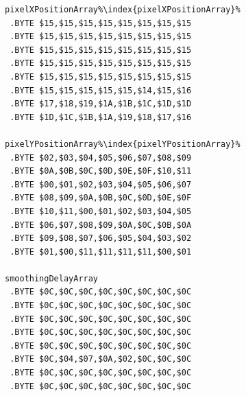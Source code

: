 \begin{minipage}[b]{0.33\linewidth}
\begin{lrbox}{\mybox}
\begin{lstlisting}[basicstyle=\ttfamily\tiny,escapechar=\%]
pixelXPositionArray%\index{pixelXPositionArray}%   
 .BYTE $15,$15,$15,$15,$15,$15,$15,$15
 .BYTE $15,$15,$15,$15,$15,$15,$15,$15
 .BYTE $15,$15,$15,$15,$15,$15,$15,$15
 .BYTE $15,$15,$15,$15,$15,$15,$15,$15
 .BYTE $15,$15,$15,$15,$15,$15,$15,$15
 .BYTE $15,$15,$15,$15,$15,$14,$15,$16
 .BYTE $17,$18,$19,$1A,$1B,$1C,$1D,$1D
 .BYTE $1D,$1C,$1B,$1A,$19,$18,$17,$16

pixelYPositionArray%\index{pixelYPositionArray}%   
 .BYTE $02,$03,$04,$05,$06,$07,$08,$09
 .BYTE $0A,$0B,$0C,$0D,$0E,$0F,$10,$11
 .BYTE $00,$01,$02,$03,$04,$05,$06,$07
 .BYTE $08,$09,$0A,$0B,$0C,$0D,$0E,$0F
 .BYTE $10,$11,$00,$01,$02,$03,$04,$05
 .BYTE $06,$07,$08,$09,$0A,$0C,$0B,$0A
 .BYTE $09,$08,$07,$06,$05,$04,$03,$02
 .BYTE $01,$00,$11,$11,$11,$11,$00,$01

smoothingDelayArray   
 .BYTE $0C,$0C,$0C,$0C,$0C,$0C,$0C,$0C
 .BYTE $0C,$0C,$0C,$0C,$0C,$0C,$0C,$0C
 .BYTE $0C,$0C,$0C,$0C,$0C,$0C,$0C,$0C
 .BYTE $0C,$0C,$0C,$0C,$0C,$0C,$0C,$0C
 .BYTE $0C,$0C,$0C,$0C,$0C,$0C,$0C,$0C
 .BYTE $0C,$04,$07,$0A,$02,$0C,$0C,$0C
 .BYTE $0C,$0C,$0C,$0C,$0C,$0C,$0C,$0C
 .BYTE $0C,$0C,$0C,$0C,$0C,$0C,$0C,$0C
\end{lstlisting}
\end{lrbox}%
\scalebox{0.8}{\usebox{\mybox}}
\end{minipage}
\hspace{0.5cm}
